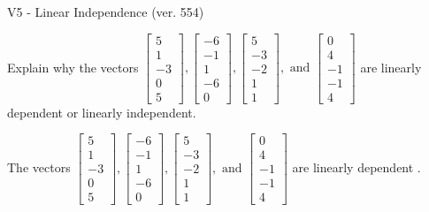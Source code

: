 \begin{exercise}
  \begin{exerciseTitle}V5 - Linear Independence (ver. 554)\end{exerciseTitle}
  \begin{exerciseStatement}
    Explain why the vectors \(\left[\begin{array}{r}
5 \\
1 \\
-3 \\
0 \\
5
\end{array}\right] , \left[\begin{array}{r}
-6 \\
-1 \\
1 \\
-6 \\
0
\end{array}\right] , \left[\begin{array}{r}
5 \\
-3 \\
-2 \\
1 \\
1
\end{array}\right] , \text{ and } \left[\begin{array}{r}
0 \\
4 \\
-1 \\
-1 \\
4
\end{array}\right]\) are linearly dependent or linearly independent.	


  \end{exerciseStatement}
  \begin{exerciseAnswer}
   The vectors \(\left[\begin{array}{r}
5 \\
1 \\
-3 \\
0 \\
5
\end{array}\right] , \left[\begin{array}{r}
-6 \\
-1 \\
1 \\
-6 \\
0
\end{array}\right] , \left[\begin{array}{r}
5 \\
-3 \\
-2 \\
1 \\
1
\end{array}\right] , \text{ and } \left[\begin{array}{r}
0 \\
4 \\
-1 \\
-1 \\
4
\end{array}\right]\) are 
  	 linearly dependent  .
  


  \end{exerciseAnswer}
\end{exercise}